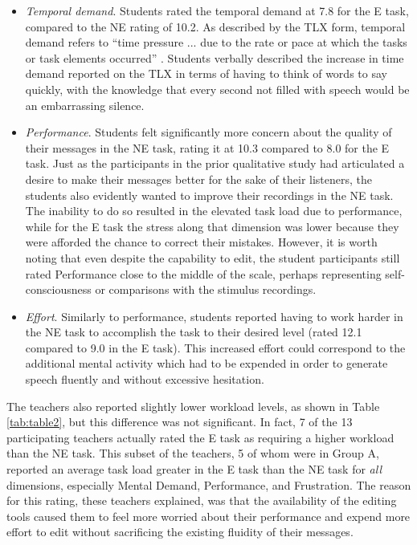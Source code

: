 \begin{itemize}
	\item \emph{Temporal demand}. Students rated the temporal demand at 7.8 for the E task, compared to the NE rating of 10.2. 
	As described by the TLX form, temporal demand refers to ``time pressure ... due to the rate or pace at which the tasks or task elements occurred'' \cite{nasatlx}.
	Students verbally described the increase in time demand reported on the TLX in terms of having to think of words to say quickly, with the knowledge that every second not filled with speech would be an embarrassing silence.
	\item \emph{Performance}. Students felt significantly more concern about the quality of their messages in the NE task, rating it at 10.3 compared to 8.0 for the E task. 
	Just as the participants in the prior qualitative study had articulated a desire to make their messages better for the sake of their listeners, the students also evidently wanted to improve their recordings in the NE task. 
	The inability to do so resulted in the elevated task load due to performance, while for the E task the stress along that dimension was lower because they were afforded the chance to correct their mistakes.
	However, it is worth noting that even despite the capability to edit, the student participants still rated Performance close to the middle of the scale, perhaps representing self-consciousness or comparisons with the stimulus recordings.
	\item \emph{Effort}. Similarly to performance, students reported having to work harder in the NE task to accomplish the task to their desired level (rated 12.1 compared to 9.0 in the E task). 
	This increased effort could correspond to the additional mental activity which had to be expended in order to generate speech fluently and without excessive hesitation.
\end{itemize}

The teachers also reported slightly lower workload levels, as shown in Table \ref{tab:table2}, but this difference was not significant.
In fact, 7 of the 13 participating teachers actually rated the E task as requiring a higher workload than the NE task.
This subset of the teachers, 5 of whom were in Group A, reported an average task load greater in the E task than the NE task for \emph{all} dimensions, especially Mental Demand, Performance, and Frustration.
The reason for this rating, these teachers explained, was that the availability of the editing tools caused them to feel more worried about their performance and expend more effort to edit without sacrificing the existing fluidity of their messages.

